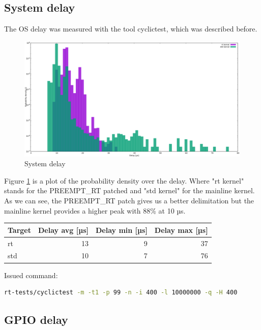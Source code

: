 \subsection{System delay}

The OS delay was measured with the tool cyclictest, which was described before.

\begin{figure}[H]
	\centering
	\includegraphics[width=1.0\textwidth]{figures/plot_system.png}
	\caption{System delay}
	\label{fig:plot_system}
\end{figure}

Figure \ref{fig:plot_system} is a plot of the probability density over the delay. Where "rt kernel" stands for the PREEMPT\_RT patched and "std kernel" for the mainline kernel.
As we can see, the PREEMPT\_RT patch gives us a better delimitation but the mainline kernel provides a higher peak with 88\% at 10 µs.

\begin{center}
    \begin{tabular}{ | l | r | r | r | }
    \hline
    \textbf{Target} & \textbf{Delay avg} [µs] & \textbf{Delay min} [µs] & \textbf{Delay max} [µs] \\ \hline
    rt & 13 & 9 & 37 \\ \hline
    std & 10 & 7 & 76 \\ \hline
    \end{tabular}
\end{center}

Issued command:

\begin{lstlisting}[language=bash]
rt-tests/cyclictest -m -t1 -p 99 -n -i 400 -l 10000000 -q -H 400
\end{lstlisting}

\subsection{GPIO delay}

